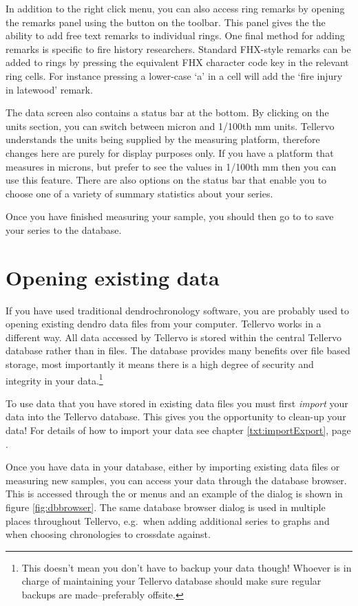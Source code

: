 In addition to the right click menu, you can also access ring remarks by opening the remarks panel using the button on the toolbar.  This panel gives the the ability to add free text remarks to individual rings.  One final method for adding remarks is specific to fire history researchers.  Standard FHX-style remarks can be added to rings by pressing the equivalent FHX character code key in the relevant ring cells.  For instance pressing a lower-case `a' in a cell will add the `fire injury in latewood' remark.   

The data screen also contains a status bar at the bottom. By clicking on the units section, you can switch between micron and 1/100th mm units. Tellervo understands the units being supplied by the measuring platform, therefore changes here are purely for display purposes only. If you have a platform that measures in microns, but prefer to see the values in 1/100th mm then you can use this feature.  There are also options on the status bar that enable you to choose one of a variety of summary statistics about your series.

Once you have finished measuring your sample, you should then go to  to save your series to the database. 


\section{Opening existing data}
If you have used traditional dendrochronology software, you are probably used to opening existing dendro data files from your computer.  Tellervo works in a different way.  All data accessed by Tellervo is stored within the central Tellervo database rather than in files.  The database provides many benefits over file based storage, most importantly it means there is a high degree of security and integrity in your data.\footnote{This doesn't mean you don't have to backup your data though!  Whoever is in charge of maintaining your Tellervo database should make sure regular backups are made--preferably offsite.}

To use data that you have stored in existing data files you must first \emph{import} your data into the Tellervo database.  This gives you the opportunity to clean-up your data!  For details of how to import your data see chapter \ref{txt:importExport}, page \pageref{txt:importExport}.

Once you have data in your database, either by importing existing data files or measuring new samples, you can access your data through the database browser.  This is accessed through the  or  menus and an example of the dialog is shown in figure \ref{fig:dbbrowser}. The same database browser dialog is used in multiple places throughout Tellervo, e.g.\ when adding additional series to graphs and when choosing chronologies to crossdate against. 

